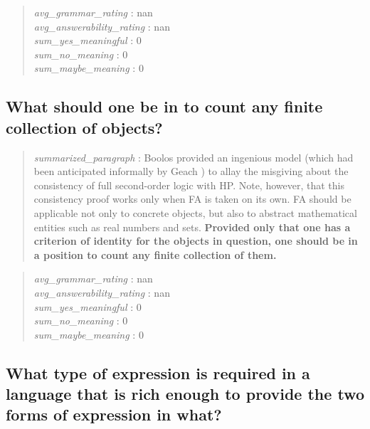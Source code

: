 \begin{quote}
\emph{avg\_grammar\_rating} : nan\\
\emph{avg\_answerability\_rating} : nan\\
\emph{sum\_yes\_meaningful} : 0\\
\emph{sum\_no\_meaning} : 0\\
\emph{sum\_maybe\_meaning} : 0
\end{quote}

\hypertarget{what-should-one-be-in-to-count-any-finite-collection-of-objects}{%
\subsection{What should one be in to count any finite collection of
objects?}\label{what-should-one-be-in-to-count-any-finite-collection-of-objects}}

\begin{quote}
\emph{summarized\_paragraph} : Boolos provided an ingenious model (which
had been anticipated informally by Geach ) to allay the misgiving about
the consistency of full second-order logic with HP. Note, however, that
this consistency proof works only when FA is taken on its own. FA should
be applicable not only to concrete objects, but also to abstract
mathematical entities such as real numbers and sets. \textbf{Provided
only that one has a criterion of identity for the objects in question,
one should be in a position to count any finite collection of them.}
\end{quote}

\begin{quote}
\emph{avg\_grammar\_rating} : nan\\
\emph{avg\_answerability\_rating} : nan\\
\emph{sum\_yes\_meaningful} : 0\\
\emph{sum\_no\_meaning} : 0\\
\emph{sum\_maybe\_meaning} : 0
\end{quote}

\hypertarget{what-type-of-expression-is-required-in-a-language-that-is-rich-enough-to-provide-the-two-forms-of-expression-in-what}{%
\subsection{What type of expression is required in a language that is
rich enough to provide the two forms of expression in
what?}\label{what-type-of-expression-is-required-in-a-language-that-is-rich-enough-to-provide-the-two-forms-of-expression-in-what}}

